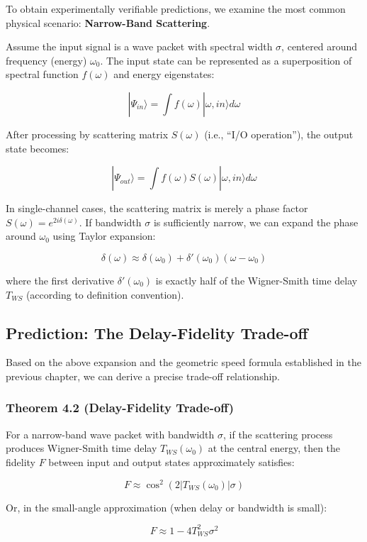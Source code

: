 To obtain experimentally verifiable predictions, we examine the most common physical scenario: \textbf{Narrow-Band Scattering}.

Assume the input signal is a wave packet with spectral width \textbf{$\sigma$}, centered around frequency (energy) \textbf{$\omega_0$}. The input state can be represented as a superposition of spectral function $f(\omega)$ and energy eigenstates:

$$|\Psi_{in}\rangle = \int f(\omega) |\omega, in\rangle d\omega$$

After processing by scattering matrix $S(\omega)$ (i.e., ``I/O operation''), the output state becomes:

$$|\Psi_{out}\rangle = \int f(\omega) S(\omega) |\omega, in\rangle d\omega$$

In single-channel cases, the scattering matrix is merely a phase factor $S(\omega) = e^{2i\delta(\omega)}$. If bandwidth $\sigma$ is sufficiently narrow, we can expand the phase around $\omega_0$ using Taylor expansion:

$$\delta(\omega) \approx \delta(\omega_0) + \delta'(\omega_0)(\omega - \omega_0)$$

where the first derivative $\delta'(\omega_0)$ is exactly half of the Wigner-Smith time delay $T_{WS}$ (according to definition convention).

\subsection{Prediction: The Delay-Fidelity Trade-off}

Based on the above expansion and the geometric speed formula established in the previous chapter, we can derive a precise trade-off relationship.

\subsubsection{Theorem 4.2 (Delay-Fidelity Trade-off)}

For a narrow-band wave packet with bandwidth \textbf{$\sigma$}, if the scattering process produces Wigner-Smith time delay \textbf{$T_{WS}(\omega_0)$} at the central energy, then the fidelity \textbf{$F$} between input and output states approximately satisfies:

$$F \approx \cos^2(2 |T_{WS}(\omega_0)| \sigma)$$

Or, in the small-angle approximation (when delay or bandwidth is small):

$$F \approx 1 - 4 T_{WS}^2 \sigma^2$$

